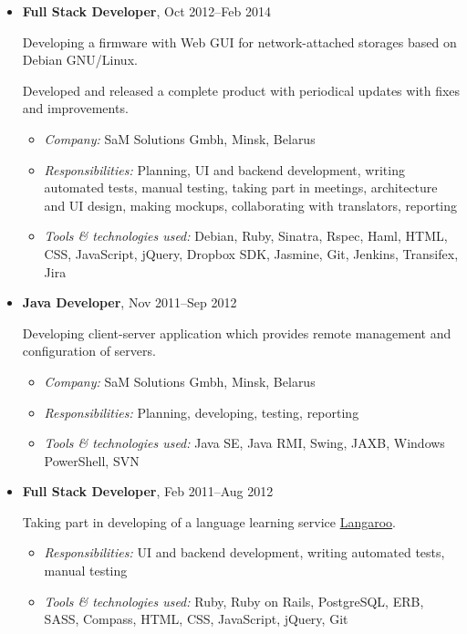 \documentclass[a4paper, 12pt]{article}
\newcommand{\position}[1]{
    \textbf{#1}}
\newcommand{\itemlabel}[1]{
    \textit{#1:}}
\begin{document}
\begin{itemize}
        \item \position{Full Stack Developer}, Oct 2012--Feb 2014

            Developing a firmware with Web GUI for network-attached storages based on Debian GNU/Linux.

            Developed and released a complete product with periodical updates with fixes and improvements.

            \begin{itemize}
                \item \itemlabel{Company} SaM Solutions Gmbh, Minsk, Belarus
                \item \itemlabel{Responsibilities} Planning, UI and backend development, writing automated tests, manual testing, taking part in meetings, architecture and UI design, making mockups, collaborating with translators, reporting
                \item \itemlabel{Tools \& technologies used} Debian, Ruby, Sinatra, Rspec, Haml, HTML, CSS, JavaScript, jQuery, Dropbox SDK, Jasmine, Git, Jenkins, Transifex, Jira
            \end{itemize}

        \item \position{Java Developer}, Nov 2011--Sep 2012

            Developing client-server application which provides remote management and configuration of servers.

            \begin{itemize}
                \item \itemlabel{Company} SaM Solutions Gmbh, Minsk, Belarus
                \item \itemlabel{Responsibilities} Planning, developing, testing, reporting
                \item \itemlabel{Tools \& technologies used} Java SE, Java RMI, Swing, JAXB, Windows PowerShell, SVN
            \end{itemize}

        \item \position{Full Stack Developer}, Feb 2011--Aug 2012

            Taking part in developing of a language learning service \href{http://langaroo.com}{Langaroo}.

            \begin{itemize}
                \item \itemlabel{Responsibilities} UI and backend development, writing automated tests, manual testing
                \item \itemlabel{Tools \& technologies used} Ruby, Ruby on Rails, PostgreSQL, ERB, SASS, Compass, HTML, CSS, JavaScript, jQuery, Git
            \end{itemize}

    \end{itemize}
\end{document}
